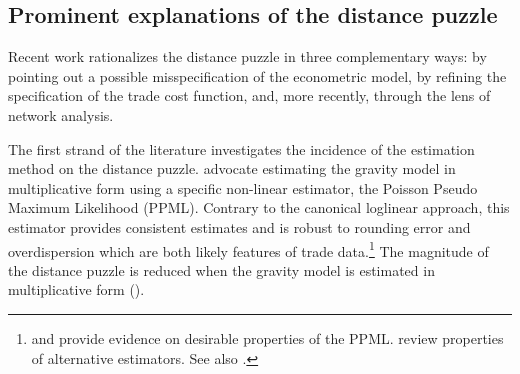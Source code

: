 \documentclass[12pt,twoside,a4paper,notitlepage]{article}
\begin{document}
\subsection*{Prominent explanations of the distance puzzle}
Recent work rationalizes the distance puzzle in three complementary ways: by pointing out a possible misspecification of the econometric model, by refining the specification of the trade cost function, and, more recently, through the lens of network analysis.

The first strand of the literature investigates the incidence of the estimation method on the distance puzzle.
\cite{SantosSilva2006} advocate estimating the gravity model in multiplicative form using a specific non-linear estimator, the Poisson Pseudo Maximum Likelihood (PPML).
Contrary to the canonical loglinear approach, this estimator provides consistent estimates and is robust to rounding error and overdispersion which are both likely features of trade data.\footnote{\cite{SantosSilva2011} and \cite{Fally2015} provide evidence on desirable properties of the PPML.
\cite{Head2014} review properties of alternative estimators.
See also \cite{Bosquet2015,Bosquet2014}.}
The magnitude of the distance puzzle is reduced when the gravity model is estimated in multiplicative form (\cite{Bosquet2015, Head2013}).
\end{document}

